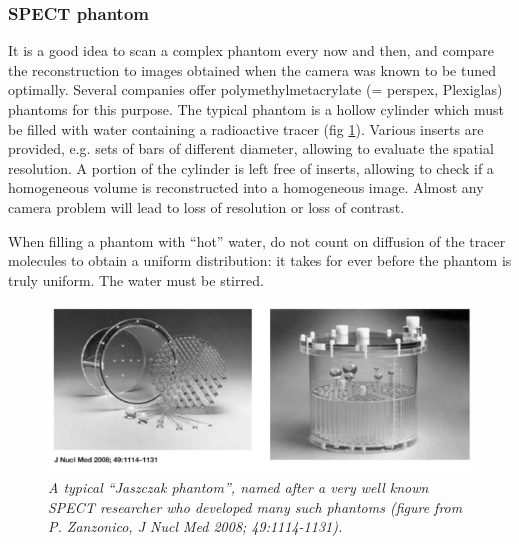 \subsubsection{SPECT phantom}
It is a good idea to scan a complex phantom every now and then, and
compare the reconstruction to images obtained when the camera was
known to be tuned optimally. Several companies offer
polymethylmetacrylate (= perspex, Plexiglas) phantoms for this
purpose. The typical phantom is a hollow cylinder which must be filled
with water containing a radioactive tracer (fig
\ref{fig:jaszczak}). Various inserts are provided, e.g. sets of bars
of different diameter, allowing to evaluate the spatial resolution. A
portion of the cylinder is left free of inserts, allowing to check if
a homogeneous volume is reconstructed into a homogeneous image. Almost
any camera problem will lead to loss of resolution or loss of
contrast.

When filling a phantom with ``hot'' water, do not count on diffusion of the
tracer molecules to obtain a uniform distribution: it takes for ever before the
phantom is truly uniform. The water must be stirred.
\begin{figure}[tb]
\centering
\includegraphics[width=1\figmedium]{figs/fig_jaszczakphantom.pdf}
\caption{\label{fig:jaszczak} \emph{A typical ``Jaszczak phantom'',
    named after a very well known SPECT researcher who developed many
    such phantoms (figure from P. Zanzonico, {\em J Nucl Med} 2008;
    49:1114-1131).}}
\end{figure}

